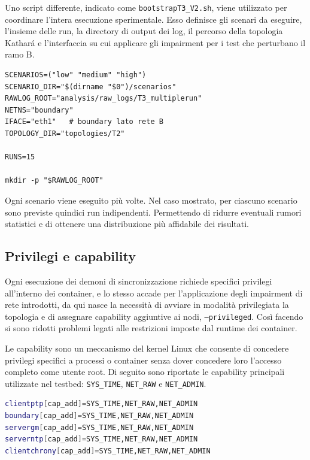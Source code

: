 Uno script differente, indicato come \texttt{bootstrapT3\_V2.sh}, viene utilizzato
per coordinare l'intera esecuzione sperimentale. Esso definisce gli scenari da
eseguire, l'insieme delle run, la directory di output dei log, il percorso della topologia
Kathará e l'interfaccia su cui applicare gli impairment per i test che perturbano
il ramo B.

\begin{listing}[H]
\begin{verbatim}
SCENARIOS=("low" "medium" "high")
SCENARIO_DIR="$(dirname "$0")/scenarios"
RAWLOG_ROOT="analysis/raw_logs/T3_multiplerun"
NETNS="boundary"
IFACE="eth1"   # boundary lato rete B
TOPOLOGY_DIR="topologies/T2"

RUNS=15

mkdir -p "$RAWLOG_ROOT"
\end{verbatim}
\caption{Variabili principali dello script \texttt{bootstrapT3\_V2.sh}.}
\label{lst:bootstrap_vars}
\end{listing}

Ogni scenario viene eseguito più volte. Nel caso mostrato, per ciascuno scenario
sono previste quindici run indipendenti. Permettendo di ridurre eventuali rumori statistici
e di ottenere una distribuzione più affidabile dei risultati.

\subsection{Privilegi e capability}

Ogni esecuzione dei demoni di sincronizzazione richiede specifici privilegi all'interno
dei container, e lo stesso accade per l'applicazione degli impairment di rete introdotti,
da qui nasce la necessità di avviare in modalità privilegiata la topologia e di
assegnare capability aggiuntive ai nodi, \texttt{--privileged}. Così facendo si sono
ridotti problemi legati alle restrizioni imposte dal runtime dei container.

Le capability sono un meccanismo del kernel Linux che consente di concedere privilegi
specifici a processi o container senza dover concedere loro l'accesso completo come
utente root. Di seguito sono riportate le capability principali utilizzate nel
testbed: \texttt{SYS\_TIME}, \texttt{NET\_RAW} e \texttt{NET\_ADMIN}.

\begin{lstlisting}[language=bash,caption={Estratto del file \texttt{lab.conf}: capability assegnate ai container.},label={lst:labconf_capabilities}]
clientptp[cap_add]=SYS_TIME,NET_RAW,NET_ADMIN
boundary[cap_add]=SYS_TIME,NET_RAW,NET_ADMIN
servergm[cap_add]=SYS_TIME,NET_RAW,NET_ADMIN
serverntp[cap_add]=SYS_TIME,NET_RAW,NET_ADMIN
clientchrony[cap_add]=SYS_TIME,NET_RAW,NET_ADMIN
\end{lstlisting}

